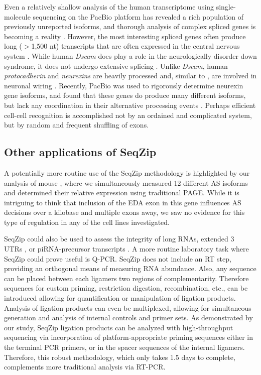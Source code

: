 {		Even a relatively shallow analysis of the human transcriptome using single-molecule sequencing on the PacBio platform has revealed a rich population of previously unreported isoforms, and thorough analysis of complex spliced genes is becoming a reality \citep{Sharon2013}. However, the most interesting spliced genes often produce long ($>$1,500 nt) transcripts that are often expressed in the central nervous system \citep{Park2007}. While human \textit{Dscam} does play a role in the neurologically disorder down syndrome, it does not undergo extensive splicing \citep{Yamakawa1998a}. Unlike \textit{Dscam}, human \textit{protocadherin} and \textit{neurexins} are heavily processed and, similar to \dscam{}, are involved in neuronal wiring \citep{Ushkaryov1992,Wu1999}. Recently, PacBio was used to rigorously determine neurexin gene isoforms, and found that these genes do produce many different isoforms, but lack any coordination in their alternative processing events \citep{Treutlein2014}. Perhaps efficient cell-cell recognition is accomplished not by an ordained and complicated system, but by random and frequent shuffling of exons.

	\subsection{Other applications of SeqZip}

		A potentially more routine use of the SeqZip methodology is highlighted by our analysis of mouse \fn{}, where we simultaneously measured 12 different AS isoforms and determined their relative expression using traditional PAGE. While it is intriguing to think that inclusion of the EDA exon in this gene influences AS decisions over a kilobase and multiple exons away, we saw no evidence for this type of regulation in any of the cell lines investigated.

		SeqZip could also be used to assess the integrity of long RNAs, extended 3\textprime~ UTRs \citep{Wang2013b}, or piRNA-precursor transcripts \citep{Li2013h}. A more routine laboratory task where SeqZip could prove useful is Q-PCR. SeqZip does not include an RT step, providing an orthogonal means of measuring RNA abundance. Also, any sequence can be placed between each ligamers two regions of complementarity. Therefore sequences for custom priming, restriction digestion, recombination, etc., can be introduced allowing for quantification or manipulation of ligation products. Analysis of ligation products can even be multiplexed, allowing for simultaneous generation and analysis of internal controls and primer sets. As demonstrated by our \dscam{} study, SeqZip ligation products can be analyzed with high-throughput sequencing via incorporation of platform-appropriate priming sequences either in the terminal PCR primers, or in the spacer sequences of the internal ligamers. Therefore, this robust methodology, which only takes 1.5 days to complete, complements more traditional analysis via RT-PCR. 


}
